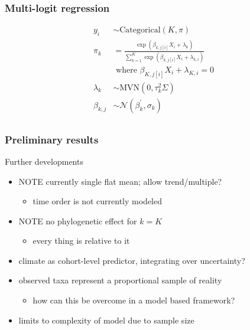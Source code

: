 \documentclass{beamer}
\begin{document}
\begin{frame}
  \frametitle{Multi-logit regression}
  \begin{equation*}
    \begin{aligned}
      y_{i} &\sim \mathrm{Categorical}(K, \pi) \\
      \pi_{k} &= \frac{\exp(\beta_{k, j[i]} X_{i} + \lambda_{k})}{\sum_{k = 1}^{K} \exp(\beta_{k, j[i]} X_{i} + \lambda_{k, i})} \\ 
      &\text{ where } \beta_{K, j[i]} X_{i} + \lambda_{K, i} = 0 \\
      \lambda_{k} &\sim \mathrm{MVN}(0, \tau_{k}^{2}\Sigma) \\
      \beta_{k, j} &\sim \mathcal{N}(\beta_{k}^{\prime}, \sigma_{k}) \\
    \end{aligned}
  \end{equation*}
\end{frame}

\begin{frame}
  \frametitle{Preliminary results}
\end{frame}

\begin{frame}
  \begin{block}{Further developments}
    \begin{itemize}
      \item \uppercase{\alert{note}} currently single flat mean; allow trend/multiple?
        \begin{itemize}
          \item time order is not currently modeled
        \end{itemize}
      \item \uppercase{\alert{note}} no phylogenetic effect for \(k = K\)
        \begin{itemize}
          \item every thing is relative \alert{to} it
        \end{itemize}
      \item climate as cohort-level predictor, integrating over uncertainty?
      \item observed taxa represent a proportional sample of reality
        \begin{itemize}
          \item how can this be overcome in a \alert{model based} framework?
        \end{itemize}
      \item limits to complexity of model due to sample size
    \end{itemize}
  \end{block}
\end{frame}
\end{document}
